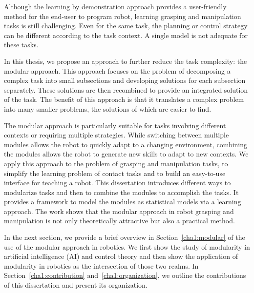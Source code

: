 Although the learning by demonstration approach provides a user-friendly method for the end-user to program robot, learning grasping and manipulation tasks is still challenging. Even for the same task, the planning or control strategy can be different according to the task context. A single model is not adequate for these tasks.


In this thesis, we propose an approach to further reduce the task complexity: the modular approach.
This approach focuses on the problem of decomposing a complex task into small subsections and developing solutions for each subsection separately. These solutions are then recombined to provide an integrated solution of the task. The benefit of this approach is that it translates a complex problem into many smaller problems, the solutions of which are easier to find.

The modular approach is particularly suitable for tasks involving different contexts or requiring multiple strategies. While switching between multiple modules allows the robot to quickly adapt to a changing environment, combining the modules allows the robot to generate new skills to adapt to new contexts. We apply this approach to the problem of grasping and manipulation tasks, to simplify the learning problem of contact tasks and to build an easy-to-use interface for teaching a robot. This dissertation introduces different ways to modularize tasks and then to combine the modules to accomplish the tasks. It provides a framework to model the modules as statistical models via a learning approach. The work shows that the modular approach in robot grasping and manipulation is not only theoretically attractive but also a practical method.

In the next section, we provide a brief overview in Section~\ref{cha1:modular} of the use of the modular approach in robotics. We first show the study of modularity in artificial intelligence (AI) and control theory and then show the application of modularity in robotics as the intersection of those two realms. In Section~\ref{cha1:contribution} and~\ref{cha1:organization}, we outline the contributions of this dissertation and present its organization.


